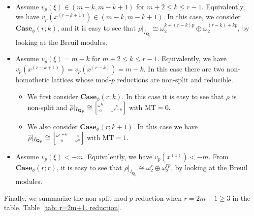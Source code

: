 \documentclass[11pt]{amsart}
\theoremstyle{definition}
\numberwithin{equation}{subsection}
\theoremstyle{plain}
\theoremstyle{plain}
\theoremstyle{plain}
\theoremstyle{plain}
\theoremstyle{plain}
\theoremstyle{plain}
\theoremstyle{plain}
\theoremstyle{plain}
\theoremstyle{plain}
\theoremstyle{plain}
\theoremstyle{plain}
\theoremstyle{plain}
\theoremstyle{definition}
\theoremstyle{definition}
\theoremstyle{definition}
\theoremstyle{remark}
\renewcommand{\(}{\textup{(}}
\renewcommand{\)}{\textup{)}}
\newcommand{\Q}{\mathbf{Q}}
\newcommand{\Qp}{\mathbf{Q}_p}
\newcommand{\rhobar}{\overline{\rho}}
\begin{document}
\begin{itemize}[leftmargin=*]
\begin{itemize}[leftmargin=*]
\begin{itemize}[leftmargin=*]
       \item otherwise, $\rhobar|_{I_{\Q_p}}\cong \omega^{m+1}\oplus\omega^m$. In particular, it is split.
       \end{itemize}
\end{itemize}
\item Assume $v_p(\xi)\in (m-k,m-k+1)$ for $m+2\leq k\leq r-1$. Equivalently, we have $v_p(x^{(r-k+1)})\in (m-k,m-k+1)$. In this case, we consider $\mathbf{Case}_\phi(r;k)$, and it is easy to see that $\rhobar|_{I_{\Q_p}}\cong \omega_2^{k+(r-k)p}\oplus\omega_2^{(r-k)+kp}$, by looking at the Breuil modules.
\item Assume $v_p(\xi)=m-k$ for $m+2\leq k\leq r-1$. Equivalently, we have $v_p(x^{(r-k+1)})=v_p(x^{(r-k)})=m-k$. In this case there are two non-homothetic lattices whose mod-$p$ reductions are non-split and reducible.
\begin{itemize}[leftmargin=*]
    \item We first consider $\mathbf{Case}_\phi(r;k)$. In this case it is easy to see that $\rhobar$ is non-split and $\rhobar|_{I_{\Qp}}\cong
    \begin{tiny}\begin{bmatrix}
    \omega^k & * \\ 0 & \omega^{r-k}
    \end{bmatrix}\end{tiny}$ with $\mathrm{MT}=0$.
    \item We also consider $\mathbf{Case}_\phi(r;k+1)$. In this case we have $\rhobar|_{I_{\Qp}}\cong
    \begin{tiny}\begin{bmatrix}
    \omega^{r-k} & * \\ 0 & \omega^{k}
    \end{bmatrix}\end{tiny}$ with $\mathrm{MT}=1$.
\end{itemize}
\item Assume $v_p(\xi)<-m$. Equivalently, we have $v_p(x^{(1)})<-m$. From $\mathbf{Case}_\phi(r;r)$, it is easy to see that $\rhobar|_{I_{\Q_p}}\cong \omega_2^r\oplus\omega_2^{rp}$, by looking at the Breuil modules.
\end{itemize}
Finally, we summarize the non-split mod-$p$ reduction when $r=2m+1\geq 3$ in the table, Table~\ref{tab: r=2m+1, reduction}.
\end{document}
